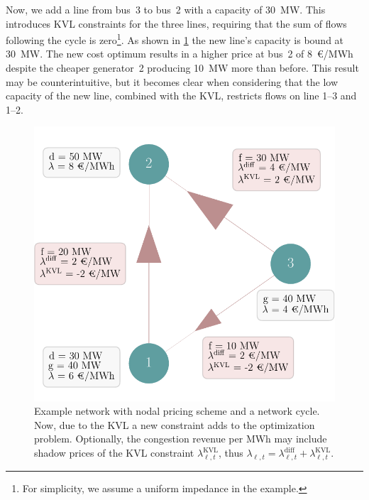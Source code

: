 \documentclass[11pt,twocolumn]{article}
\newcommand{\lmp}[1][n]{\lambda_{#1,t}}
\newcommand{\lmpdiff}[1][\ell]{\lmp[#1]^\text{diff}}
\newcommand{\lmpkvl}[1][\ell]{\lmp[#1]^\text{KVL}}
\begin{document}
Now, we add a line from bus~3 to bus~2 with a capacity of 30~MW. This introduces \ac{KVL} constraints for the three lines, requiring that the sum of flows following the cycle is zero\footnote{For simplicity, we assume a uniform impedance in the example.}. As shown in \cref{fig:example-network} the new line's capacity is bound at 30~MW. The new cost optimum results in a higher price at bus~2 of 8~\euro/MWh despite the cheaper generator~2 producing 10~MW more than before. This result may be counterintuitive, but it becomes clear when considering that the low capacity of the new line, combined with the \ac{KVL}, restricts flows on line 1--3 and 1--2.   

\begin{figure}[h!]
        \includegraphics[width=\linewidth]{example-with-cycles/network}
        \caption{Example network with nodal pricing scheme and a network cycle. Now, due to the \ac{KVL} a new constraint adds to the optimization problem. Optionally, the congestion revenue per MWh may include shadow prices of the \ac{KVL} constraint $\lmpkvl$, thus $\lmp[\ell] = \lmpdiff + \lmpkvl$.}
        \label{fig:example-network}            
\end{figure}
\end{document}
